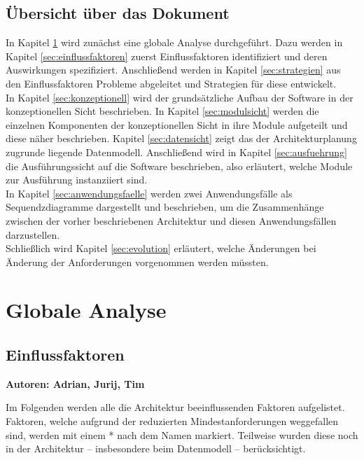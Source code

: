 \documentclass[fontsize=12pt,paper=a4,twoside]{scrartcl}
\begin{document}
\subsection{Übersicht über das Dokument}
In Kapitel \ref{sec:globale_analyse} wird zunächst eine globale Analyse durchgeführt. Dazu werden in Kapitel \ref{sec:einflussfaktoren} zuerst Einflussfaktoren identifiziert und deren Auswirkungen spezifiziert. Anschließend werden in Kapitel \ref{sec:strategien} aus den Einflussfaktoren Probleme abgeleitet und Strategien für diese entwickelt. \\
In Kapitel \ref{sec:konzeptionell} wird der grundsätzliche Aufbau der Software in der konzeptionellen Sicht beschrieben. In Kapitel \ref{sec:modulsicht} werden die einzelnen Komponenten der konzeptionellen Sicht in ihre Module aufgeteilt und diese näher beschrieben. Kapitel \ref{sec:datensicht} zeigt das der Architekturplanung zugrunde liegende Datenmodell. Anschließend wird in Kapitel \ref{sec:ausfuehrung} die Ausführungssicht auf die Software beschrieben, also erläutert, welche Module zur Ausführung instanziiert sind. 
\\
In Kapitel \ref{sec:anwendungsfaelle} werden zwei Anwendungsfälle als Sequendzdiagramme dargestellt und beschrieben, um die Zusammenhänge zwischen der vorher beschriebenen Architektur und diesen Anwendungsfällen darzustellen.\\
Schließlich wird Kapitel \ref{sec:evolution} erläutert, welche Änderungen bei Änderung der Anforderungen vorgenommen werden müssten.

\newpage

\section{Globale Analyse}
\label{sec:globale_analyse}

\subsection{Einflussfaktoren}
\textbf{Autoren: Adrian, Jurij, Tim}\\
\label{sec:einflussfaktoren}

Im Folgenden werden alle die Architektur beeinflussenden Faktoren aufgelistet. Faktoren, welche aufgrund der reduzierten Mindestanforderungen weggefallen sind, werden mit einem * nach dem Namen markiert. Teilweise wurden diese noch in der Architektur -- insbesondere beim Datenmodell -- berücksichtigt.
\end{document}

